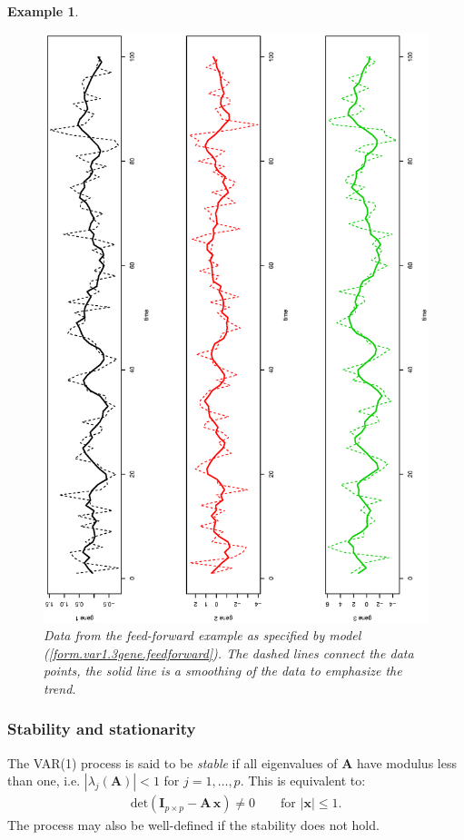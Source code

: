 \documentclass[a4paper]{article}
\theoremstyle{myexamplestyle}
\newtheorem{example}{Example}
\begin{document}
\begin{example}
\begin{figure}[h!]
\begin{center}
\includegraphics[angle=270, scale=0.50]{feedforward3gene_data.ps}
\end{center}
\caption{Data from  the feed-forward example as specified by model (\ref{form.var1.3gene.feedforward}). The dashed lines connect the data points, the solid line is a smoothing of the data to emphasize the trend. \label{fig.feedforward.data}}
\end{figure}
\clearpage

\end{example}


\subsubsection{Stability and stationarity}
The VAR(1) process is said to be {\it stable} if all eigenvalues of $\mathbf{A}$ have modulus less than one, i.e. $|\lambda_j(\mathbf{A})| < 1$ for $j=1,\ldots,p$. This is equivalent to:
\begin{eqnarray*}
\mbox{det}( \mathbf{I}_{p \times p} - \mathbf{A} \, \mathbf{x}) \not= 0  \qquad \mbox{for } | \mathbf{x} | \leq 1.
\end{eqnarray*}
The process may also be well-defined if the stability does not hold.
\end{document}
